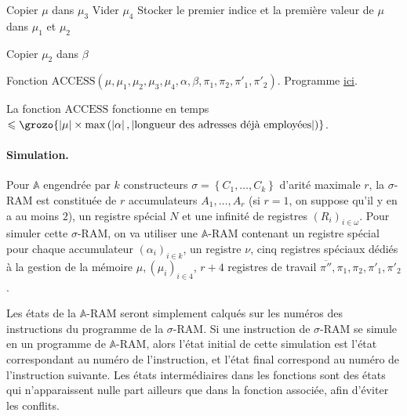 \documentclass{report}
\newcommand{\bbA}{\mathbb{A}}
\begin{document}
\begin{demo}
\begin{algorithm}[H]
						
						Copier $\mu$ dans $\mu_3$ \;
						Vider $\mu_4$ \;
						Stocker le premier indice et la première valeur de $\mu$ dans $\mu_1$ et $\mu_2$ \;
						
						\espace
						
						
						
						
						Copier $\mu_2$ dans $\beta$ \;
						
						\caption{Fonction $\text{ACCESS}\left( \mu, \mu_1, \mu_2, \mu_3, \mu_4, \alpha, \beta, \pi_1, \pi_2, \pi'_1, \pi'_2\right)$. Programme \hyperref[prog:A_RAM_fn_ACCESS]{ici}. }
					\end{algorithm}
					

					La fonction $\text{ACCESS}$ fonctionne en temps $\leqslant \grozo{\left| \mu \right| \times \max\left( \left| \alpha \right| , \left| \text{longueur des adresses déjà employées} \right| \right) }$.
					
					\paragraph{Simulation.}
					\label{par:sim_sigma_RAM_A_RAM}
					Pour $\bbA$ engendrée par $k$ constructeurs $\sigma = \left\lbrace C_1, \dots, C_k\right\rbrace$ d'arité maximale $r$, la $\sigma$-RAM est constituée de $r$ accumulateurs $A_1, \dots, A_r$ (si $r = 1$, on suppose qu'il y en a au moins $2$), un registre spécial $N$ et une infinité de registres $(R_i)_{i \in \omega}$. Pour simuler cette $\sigma$-RAM, on va utiliser une $\bbA$-RAM contenant un registre spécial pour chaque accumulateur $(\alpha_i)_{i \in k}$, un registre $\nu$, cinq registres spéciaux dédiés à la gestion de la mémoire $\mu, (\mu_i)_{i \in 4}$, $r+4$ registres de travail $\overline{\pi''}, \pi_1, \pi_2, \pi'_1, \pi'_2$.
					
					Les états de la $\bbA$-RAM seront simplement calqués sur les numéros des instructions du programme de la $\sigma$-RAM. Si une instruction de $\sigma$-RAM se simule en un programme de $\bbA$-RAM, alors l'état initial de cette simulation est l'état correspondant au numéro de l'instruction, et l'état final correspond au numéro de l'instruction suivante. Les états intermédiaires dans les fonctions sont des états qui n'apparaissent nulle part ailleurs que dans la fonction associée, afin d'éviter les conflits. 
						

\end{demo}
\end{document}

